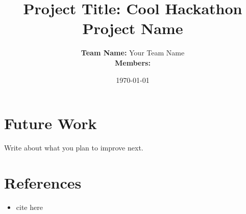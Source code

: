 \documentclass[11pt, a4paper]{article}
\title{\textbf{Project Title: Cool Hackathon Project Name}}
\author{
    \textbf{Team Name:} Your Team Name \\[0.3em]
    \textbf{Members:}  \\[0.3em]
}
\date{\today}
\begin{document}
\maketitle

\section{Future Work}
Write about what you plan to improve next.

\section*{References}
\begin{itemize}
    \item cite here 
\end{itemize}
\end{document}

